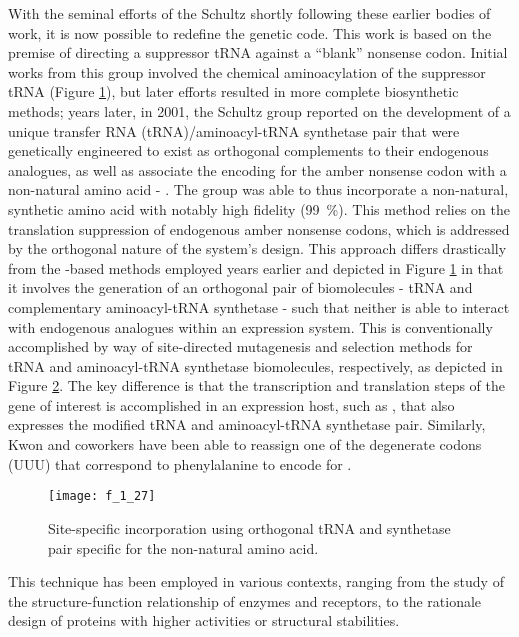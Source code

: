 \begin{refsection}
\begin{figure}[h!]
{    \cite{Noren1989}}\label{fig:schultz_schema} \end{figure}
With the seminal efforts of the Schultz \cite{Noren1989} shortly
following these earlier bodies of work, it is now possible to redefine the
genetic code. This work is based on the premise of directing a suppressor tRNA
against a ``blank'' nonsense codon. Initial works from this group involved the
chemical aminoacylation of the suppressor tRNA  (Figure
\ref{fig:schultz_schema}), but later efforts resulted in more complete
biosynthetic methods; years later, in 2001, the Schultz group reported on the
development of a unique transfer RNA (tRNA)/aminoacyl-tRNA synthetase pair that
were genetically engineered to exist as orthogonal complements to their
endogenous analogues, as well as associate the encoding for the amber nonsense
codon with a non-natural amino acid - . The
group was able to thus incorporate a non-natural, synthetic amino acid with
notably high fidelity (\SI{99}{\percent}).\cite{Wang2001} This method relies on
the translation suppression of endogenous amber nonsense codons, which is
addressed by the orthogonal nature of the system's design. This approach differs
drastically from the -based methods employed years earlier and
depicted in Figure \ref{fig:schultz_schema} in that it involves the generation
of an orthogonal pair of biomolecules - tRNA and complementary aminoacyl-tRNA
synthetase - such that neither is able to interact with endogenous analogues
within an expression system. This is conventionally accomplished by way of
site-directed mutagenesis and  selection methods for tRNA and
aminoacyl-tRNA synthetase biomolecules, respectively, as depicted in Figure
\ref{fig:orthogonal_incorporation}. The key difference is that the transcription
and translation steps of the gene of interest is accomplished in an expression
host, such as , that also expresses the modified tRNA and
aminoacyl-tRNA synthetase pair. Similarly, Kwon and coworkers have been able to
reassign one of the degenerate codons (UUU) that correspond to phenylalanine to
encode for .\cite{Kwon2003}
\begin{figure}[h!] \centering \texttt{[image: f\_1\_27]}
    \caption[]{Site-specific incorporation using orthogonal tRNA and synthetase
        pair specific for the non-natural amino acid.\cite{Yoder2002}}
    \label{fig:orthogonal_incorporation} \end{figure}
This technique has been employed in various contexts, ranging from the study of
the structure-function relationship of enzymes and receptors, to the rationale
design of proteins with higher activities or structural stabilities.


\end{refsection}
